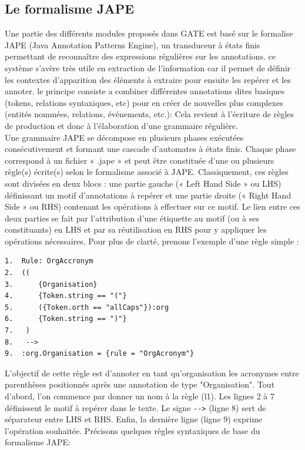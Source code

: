\documentclass[a4paper, 11pt]{report}
\begin{document}
\subsection{Le formalisme JAPE}
Une partie des différents modules proposés dans GATE est basé sur le formalise JAPE (Java Annotation Patterns Engine), un transduceur à états finis permettant de reconnaître des expressions régulières sur les annotations. ce système s'avère très utile en extraction de l'information car il permet de définir les contextes d'apparition des éléments à extraire pour ensuite les repérer et les annoter. le principe consiste a combiner différentes annotations dites basiques (tokens, relations syntaxiques, etc) pour en créer de nouvelles plus complexes (entités nommées, relations, événements, etc.): Cela revient à l'écriture de règles de production et donc à l'élaboration d'une grammaire régulière.\\
Une grammaire JAPE se décompose en plusieurs phases exécutées consécutivement et
formant une cascade d'automates à états finis. Chaque phase correspond à un fichier « .jape » et
peut être constituée d'une ou plusieurs règle(s) écrite(s) selon le formalisme associé à JAPE. Classiquement, ces règles sont divisées en deux blocs : une partie gauche (« Left Hand
Side » ou LHS) définissant un motif d'annotations à repérer et une partie droite (« Right Hand
Side » ou RHS) contenant les opérations à effectuer sur ce motif. Le lien entre ces deux parties se
fait par l'attribution d'une étiquette au motif (ou à ses constituants) en LHS et par sa réutilisation en
RHS pour y appliquer les opérations nécessaires. Pour plus de clarté, prenons l'exemple d'une règle
simple :
\begin{verbatim}
1.	Rule: OrgAccronym
2.	((
3.		{Organisation}
4.		{Token.string == "("}
5.		({Token.orth == "allCaps"}):org
6.		{Token.string == ")"}
7.	 )
8.	 -->
9.	:org.Organisation = {rule = "OrgAcronym"}
\end{verbatim}
L'objectif de cette règle est d'annoter en tant qu'organisation les acronymes entre parenthèses positionnés après une annotation de type "Organisation". Tout d'abord, l'on commence par donner un nom à la règle (l1). Les lignes 2 à 7 définissent le motif à repérer dans le texte. Le signe \verb|-->| (ligne 8) sert de séparateur entre LHS et RHS. Enfin, la dernière ligne (ligne 9) exprime l'opération souhaitée. Précisons quelques règles syntaxiques de base du formalisme JAPE:
\end{document}
